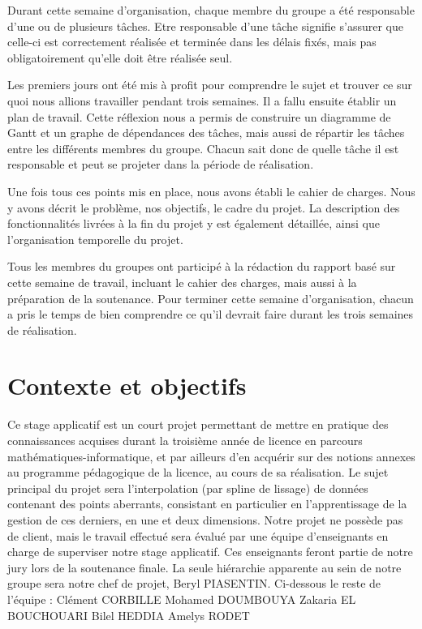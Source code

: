 \documentclass[a4paper,10pt]{article} %
\begin{document}
Durant cette semaine d'organisation, chaque membre du groupe a été responsable d’une ou de plusieurs tâches. Etre responsable d'une tâche signifie s'assurer que celle-ci est correctement réalisée et terminée dans les délais fixés, mais pas obligatoirement qu'elle doit être réalisée seul.

Les premiers jours ont été mis à profit pour comprendre le sujet et trouver ce sur quoi nous allions travailler pendant trois semaines. Il a fallu ensuite établir un plan de travail. Cette réflexion nous a permis de construire un diagramme de Gantt et un graphe de dépendances des tâches, mais aussi de répartir les tâches entre les différents membres du groupe. Chacun sait donc de quelle tâche il est responsable et peut se projeter dans la période de réalisation.

Une fois tous ces points mis en place, nous avons établi le cahier de charges. Nous y avons décrit le problème, nos objectifs, le cadre du projet. La description des fonctionnalités livrées à la fin du projet y est également détaillée, ainsi que l'organisation temporelle du projet. 

Tous les membres du groupes ont participé à la rédaction du rapport basé sur cette semaine de travail, incluant le cahier des charges, mais aussi à la préparation de la soutenance. Pour terminer cette semaine d'organisation, chacun a pris le temps de bien comprendre ce qu'il devrait faire durant les trois semaines de réalisation. 


\newpage
\section{Contexte et objectifs}
Ce stage applicatif est un court projet permettant de mettre en pratique des connaissances acquises durant la troisième année de licence en parcours mathématiques-informatique, et par ailleurs d’en acquérir sur des notions annexes au programme pédagogique de la licence, au cours de sa réalisation. Le sujet principal du projet sera l’interpolation (par spline de lissage) de données contenant des points aberrants, consistant en particulier en l'apprentissage de la gestion de ces derniers, en une et deux dimensions.
Notre projet ne possède pas de client, mais le  travail effectué sera évalué par une équipe d’enseignants en charge de superviser notre stage applicatif. Ces enseignants feront partie de notre jury lors de la soutenance finale. La seule hiérarchie apparente au sein de notre groupe sera notre chef de projet, Beryl PIASENTIN. Ci-dessous le reste de l’équipe :
Clément CORBILLE 
Mohamed DOUMBOUYA
Zakaria EL BOUCHOUARI
Bilel HEDDIA
Amelys RODET
\end{document}
